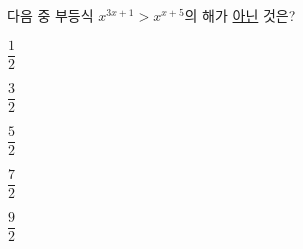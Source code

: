 다음 중 부등식 $x^{3x+1}>x^{x+5}$의 해가 \underline{아닌} 것은? 
\begin{choices32}{\rule[-3ex]{0pt}{8ex}$\dfrac{1}{2}$}{\rule[-3ex]{0pt}{8ex}$\dfrac{3}{2}$}{\rule[-3ex]{0pt}{8ex}$\dfrac{5}{2}$}{\rule[-3ex]{0pt}{8ex}$\dfrac{7}{2}$}{\rule[-3ex]{0pt}{8ex}$\dfrac{9}{2}$}\end{choices32}
